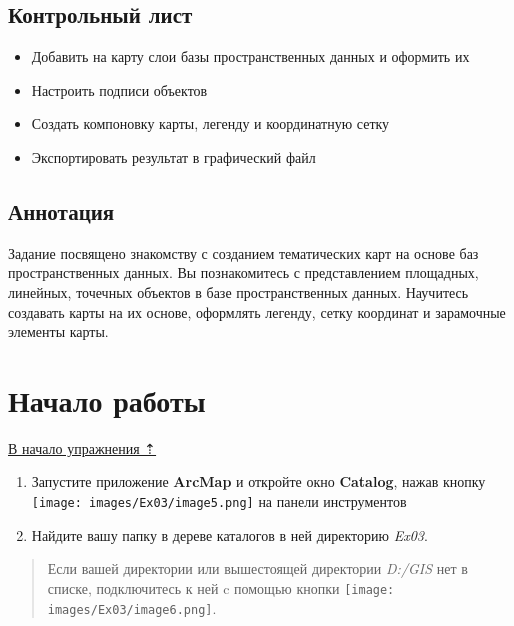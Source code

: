 \documentclass[12pt,]{book}
\providecommand{\tightlist}{%
  \setlength{\itemsep}{0pt}\setlength{\parskip}{0pt}}
\begin{document}
\hypertarget{map-design-climates-control}{%
\subsection{Контрольный лист}\label{map-design-climates-control}}

\begin{itemize}
\tightlist
\item
  Добавить на карту слои базы пространственных данных и оформить их
\item
  Настроить подписи объектов
\item
  Создать компоновку карты, легенду и координатную сетку
\item
  Экспортировать результат в графический файл
\end{itemize}

\hypertarget{map-design-climates-annotation}{%
\subsection{Аннотация}\label{map-design-climates-annotation}}

Задание посвящено знакомству с созданием тематических карт на основе баз
пространственных данных. Вы познакомитесь с представлением площадных,
линейных, точечных объектов в базе пространственных данных. Научитесь
создавать карты на их основе, оформлять легенду, сетку координат и
зарамочные элементы карты.

\hypertarget{map-design-climates-begin}{%
\section{Начало работы}\label{map-design-climates-begin}}

\protect\hyperlink{map-design-climates}{В начало упражнения ⇡}

\begin{enumerate}
\def\labelenumi{\arabic{enumi}.}
\item
  Запустите приложение \textbf{ArcMap} и откройте окно \textbf{Catalog}, нажав кнопку \texttt{[image: images/Ex03/image5.png]} на панели инструментов
\item
  Найдите вашу папку в дереве каталогов в ней директорию \emph{Ex03}.
\end{enumerate}

\begin{quote}
Если вашей директории или вышестоящей директории \emph{D:/GIS} нет в списке, подключитесь к ней c помощью кнопки \texttt{[image: images/Ex03/image6.png]}.
\end{quote}
\end{document}
